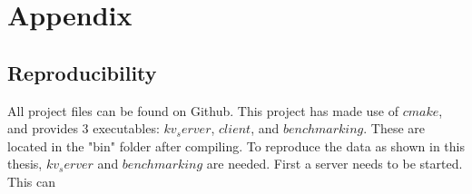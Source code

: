 
\chapter*{Appendix} %



\ifpdf
    \graphicspath{{X/figures/PNG/}{X/figures/PDF/}{X/figures/}}
\else
    \graphicspath{{X/figures/EPS/}{X/figures/}}
\fi

%
%

\section{Reproducibility}
All project files can be found on Github\cite{github}.
This project has made use of $cmake$, and provides 3 executables: $kv_server$, $client$, and $benchmarking$.
These are located in the "bin" folder after compiling.
To reproduce the data as shown in this thesis, $kv_server$ and $benchmarking$ are needed.
First a server needs to be started. This can






